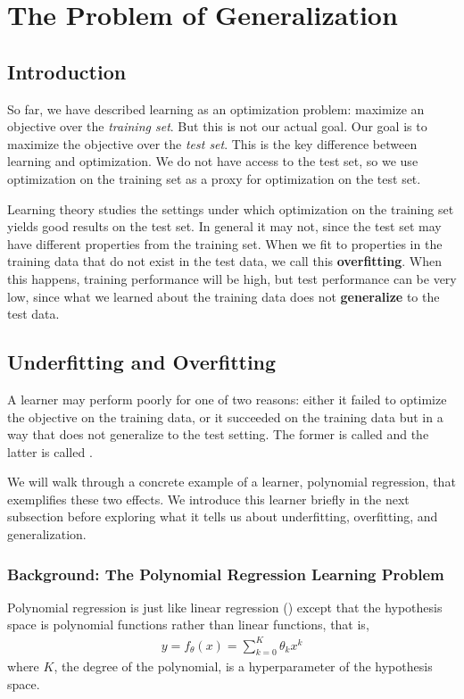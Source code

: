 
\chapter{The Problem of Generalization}\label{chapter:problem_of_generalization}

\section{Introduction}

So far, we have described learning as an optimization problem: maximize an objective over the \emph{training set}. But this is not our actual goal. Our goal is to maximize the objective over the \emph{test set}. This is the key difference between learning and optimization. We do not have access to the test set, so we use optimization on the training set as a proxy for optimization on the test set. 

Learning theory studies the settings under which optimization on the training set yields good results on the test set. In general it may not, since the test set may have different properties from the training set. When we fit to properties in the training data that do not exist in the test data, we call this {\bf overfitting}. When this happens, training performance will be high, but test performance can be very low, since what we learned about the training data does not {\bf generalize} to the test data.

\section{Underfitting and Overfitting}

A learner may perform poorly for one of two reasons: either it failed to optimize the objective on the training data, or it succeeded on the training data but in a way that does not generalize to the test setting. The former is called  and the latter is called .

We will walk through a concrete example of a learner, polynomial regression, that exemplifies these two effects. We introduce this learner briefly in the next subsection before exploring what it tells us about underfitting, overfitting, and generalization.

\subsection{Background: The Polynomial Regression Learning Problem}
Polynomial regression is just like linear regression (\chap{\ref{chapter:intro_to_learning}}) except that the hypothesis space is polynomial functions rather than linear functions, that is,
\begin{align}
y = f_{\theta}(x) = \sum_{k=0}^K \theta_k x^k
\end{align}
where $K$, the degree of the polynomial, is a hyperparameter of the hypothesis space.

